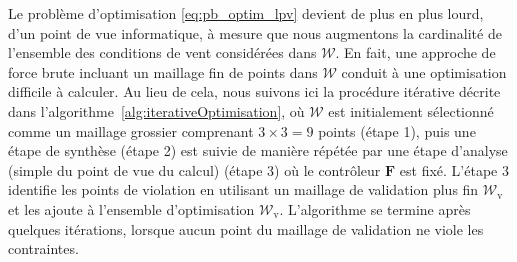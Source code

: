 Le problème d'optimisation \eqref{eq:pb_optim_lpv} devient de plus en plus lourd, d'un point de vue informatique, à mesure que nous augmentons la cardinalité de l'ensemble des conditions de vent considérées dans ${\mathcal W}$. En fait, une approche de force brute incluant un maillage fin de points dans ${\mathcal W}$ conduit à une optimisation difficile à calculer. Au lieu de cela, nous suivons ici la procédure itérative décrite dans l'algorithme~\ref{alg:iterativeOptimisation}, où ${\mathcal W}$ est initialement sélectionné comme un maillage grossier comprenant $3 \times 3 = 9$ points (étape 1), puis une étape de synthèse (étape 2) est suivie de manière répétée par une étape d'analyse (simple du point de vue du calcul) (étape 3) où le contrôleur $\boldsymbol{F}$ est fixé.
L'étape 3 identifie les points de violation en utilisant un maillage de validation plus fin ${\mathcal W}_{\text{v}}$ et les ajoute à l'ensemble d'optimisation ${\mathcal W}_{\text{v}}$. L'algorithme se termine après quelques itérations, lorsque aucun point du maillage de validation ne viole les contraintes.

